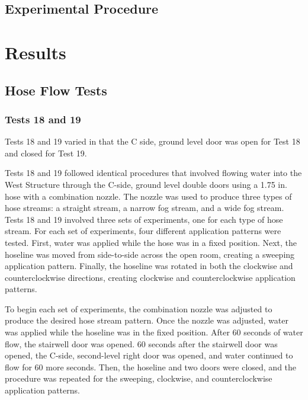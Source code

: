 \documentclass[12pt,oneside]{book}
\begin{document}
\section{Experimental Procedure}


\chapter{Results}
\label{chap:Results}

\section{Hose Flow Tests}
\subsection{Tests 18 and 19}

Tests 18 and 19 varied in that the C side, ground level door was open for Test 18 and closed for Test 19. 

Tests 18 and 19 followed identical procedures that involved flowing water into the West Structure through the C-side, ground level double doors using a 1.75 in. hose with a combination nozzle. The nozzle was used to produce three types of hose streams: a straight stream, a narrow fog stream, and a wide fog stream. Tests 18 and 19 involved three sets of experiments, one for each type of hose stream. For each set of experiments, four different application patterns were tested. First, water was applied while the hose was in a fixed position. Next, the hoseline was moved from side-to-side across the open room, creating a sweeping application pattern. Finally, the hoseline was rotated in both the clockwise and counterclockwise directions, creating clockwise and counterclockwise application patterns. 

To begin each set of experiments, the combination nozzle was adjusted to produce the desired hose stream pattern. Once the nozzle was adjusted, water was applied while the hoseline was in the fixed position. After 60 seconds of water flow, the stairwell door was opened. 60 seconds after the stairwell door was opened, the C-side, second-level right door was opened, and water continued to flow for 60 more seconds. Then, the hoseline and two doors were closed, and the procedure was repeated for the sweeping, clockwise, and counterclockwise application patterns.
\end{document}
